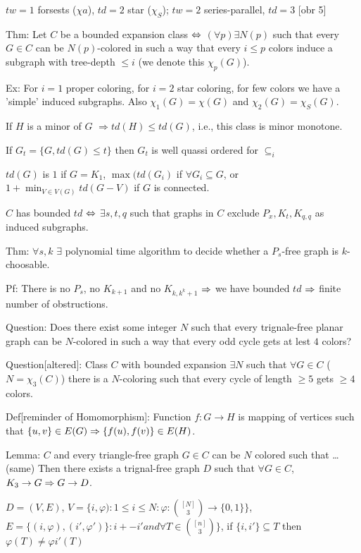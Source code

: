 $tw=1$ forsests ($\chi a$), $td = 2$ star ($\chi_S$); $tw=2$ series-parallel, $td=3$ [obr 5]

Thm: Let $C$ be a bounded expansion class $\Leftrightarrow$ $(\forall p) \exists N(p)$ such that every $G\in C$ can be $N(p)$-colored in such a way that every $i \leq p$ colors induce a subgraph with tree-depth $\leq i$ (we denote this $\chi_p(G)$).


Ex: For $i=1$ proper coloring, for $i=2$ star coloring, for few colors we have a 'simple' induced subgraphs. Also $\chi_1(G)=\chi(G)$ and $\chi_2(G)=\chi_S(G)$.

If $H$ is a minor of $G$ $\Rightarrow td(H) \leq td(G)$, i.e., this class is minor monotone.

If $G_t = \{G,td(G) \leq t\}$ then $G_t$ is well quassi ordered for $\subseteq_i$

$td(G)$ is $1$ if $G=K_1$, $\max(td(G_i)$ if $\forall G_i \subseteq G$, or $1+\min_{V\in V(G)} td(G-V)$ if $G$ is connected.

$C$ has bounded $td$ $\Leftrightarrow$ $\exists s,t,q$ such that graphs in $C$ exclude $P_x, K_t, K_{q,q}$ as induced subgraphs.

Thm: $\forall s,k$ $\exists$ polynomial time algorithm to decide whether a $P_s$-free graph is $k$-choosable.

Pf: There is no $P_s$, no $K_{k+1}$ and no $K_{k,k^k+1}$ $\Rightarrow$ we have bounded $td$ $\Rightarrow$ finite number of obstructions.

Question: Does there exist some integer $N$ such that every trignale-free planar graph can be $N$-colored in such a way that every odd cycle gets at lest $4$ colors?

Question[altered]: Class $C$ with bounded expansion $\exists N$ such that $\forall G\in C$ ($N=\chi_3(C)$) there is a $N$-coloring such that every cycle of length $\geq 5$ gets $\geq 4$ colors.

Def[reminder of Homomorphism]: Function $f: G\rightarrow H$ is mapping of vertices such that $\{u,v\}\in E(G) \Rightarrow \{f(u),f(v)\}\in E(H)$.

\def\nrightarrow{\rightarrow}

Lemma: $C$ and every triangle-free graph $G \in C$ can be $N$ colored such that \dots (same)
Then there exists a trignal-free graph $D$ such that $\forall G \in C$, $K_3 \nrightarrow G \RA G \rightarrow D$.

$D=(V,E)$, $V=\{i,\varphi) :1\leq i\leq N:\varphi:{[N]\choose 3} \rightarrow\{0,1\}\}$, $E = \{(i,\varphi),(i',\varphi ')\}: i+-i' {and} \forall T\in {[n] \choose 3}\}$, if $\{i,i'\} \subseteq T$ then $\varphi(T) \neq \varphi i'(T)$

